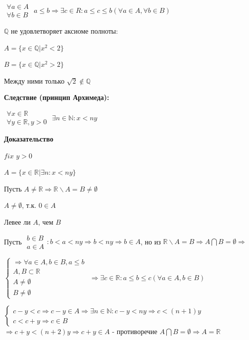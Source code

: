 \documentclass[14pt, letter paper]{article}
\begin{document}
$\begin{gathered} \forall a \in A \\ \forall b \in B \end{gathered}$ $a \leq b \Rightarrow \exists c \in R: a \leq c \leq b (\forall a \in A, \forall b \in B)$

$\mathds{Q}$ не удовлетворяет аксиоме полноты:

$A = \{ x \in \mathds{Q} | x^2 < 2 \}$

$B = \{ x \in \mathds{Q} | x^2 > 2 \}$

Между ними только $\sqrt{2} \notin \mathds{Q}$

\textbf{Следствие (принцип Архимеда):}

$\begin{gathered}
    \forall x \in \mathds{R} \\
    \forall y \in \mathds{R}, y > 0
\end{gathered}$
$\exists n \in \mathds{N} : x < ny$

\begin{center}
    \textbf{Доказательство}
\end{center}

$fix$ $y > 0$

$A = \{ x \in \mathds{R} | \exists n : x < ny\}$

Пусть $A \neq \mathds{R} \Rightarrow \mathds{R} \backslash A = B \neq \emptyset$

$A \neq \emptyset$, т.к. $0 \in A$

Левее ли $A$, чем $B$

Пусть $\begin{gathered} b \in B \\ a \in A \end{gathered}: b < a < ny \Rightarrow b < ny \Rightarrow b \in A$, но из $\mathds{R} \backslash A = B \Rightarrow A \bigcap B = \emptyset \Rightarrow$ 

$\begin{cases}
\Rightarrow \forall a \in A, b \in B, a \leq b \\
A, B \subset \mathds{R} \\ 
A \neq \emptyset \\
B \neq \emptyset 
\end{cases}$
$\Rightarrow \exists c \in \mathds{R}: a \leq b \leq c (\forall a \in A, b \in B)$

$\begin{cases}
c - y < c \Rightarrow c - y \in A \Rightarrow \exists n \in \mathds{N} : c - y < ny \Rightarrow c < (n+1)y \\
c < c + y \Rightarrow c \in B
\end{cases}$
$\Rightarrow c + y < (n+2)y \Rightarrow c + y \in A$ - противоречие $A \bigcap B = \emptyset \Rightarrow A = \mathds{R}$
\end{document}
